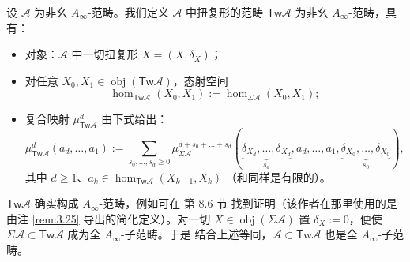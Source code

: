 \begin{Def}\label{def:3.28}
设 $\mathcal A$ 为非幺 $A_\infty$-范畴。我们定义 $\mathcal A$ 中扭复形的范畴
$\mathsf{Tw}\mathcal A$ 为非幺 $A_\infty$-范畴，具有：
\begin{itemize}
  \item 对象：$\mathcal A$ 中一切扭复形 $X=(X,\delta_X)$；
  \item 对任意 $X_0,X_1\in\operatorname{obj}(\mathsf{Tw}\mathcal A)$，态射空间
        \begin{equation}\label{eq:3.45}
          \hom_{\mathsf{Tw}\mathcal A}(X_0,X_1):=
          \hom_{\Sigma\mathcal A}(X_0,X_1);
        \end{equation}
  \item 复合映射 $\mu^d_{\mathsf{Tw}\mathcal A}$ 由下式给出：
        \begin{equation}\label{eq:3.46}
          \mu^d_{\mathsf{Tw}\mathcal A}(a_d,\dots,a_1):=
          \sum_{s_0,\dots,s_d\ge 0}\mu^{d+s_0+\dots+s_d}_{\Sigma\mathcal A}
          (\underbrace{\delta_{X_d},\dots,\delta_{X_d}}_{s_d},
          a_d,\dots,a_1,\underbrace{\delta_{X_0},\dots,\delta_{X_0}}_{s_0}),
        \end{equation}
        其中 $d\ge 1$、$a_k\in\hom_{\mathsf{Tw}\mathcal A}(X_{k-1},X_k)$
        （和同样是有限的）。
\end{itemize}
\end{Def}
$\mathsf{Tw}\mathcal A$ 确实构成 $A_\infty$-范畴，例如可在 \cite{Kel01} 第 8.6 节
找到证明（该作者在那里使用的是由注 \ref{rem:3.25} 导出的简化定义）。对一切
$X\in\operatorname{obj}(\Sigma\mathcal A)$ 置 $\delta_X:=0$，便使
$\Sigma\mathcal A\subset\mathsf{Tw}\mathcal A$ 成为全 $A_\infty$-子范畴。于是
结合上述等同，$\mathcal A\subset\mathsf{Tw}\mathcal A$ 也是全
$A_\infty$-子范畴。

